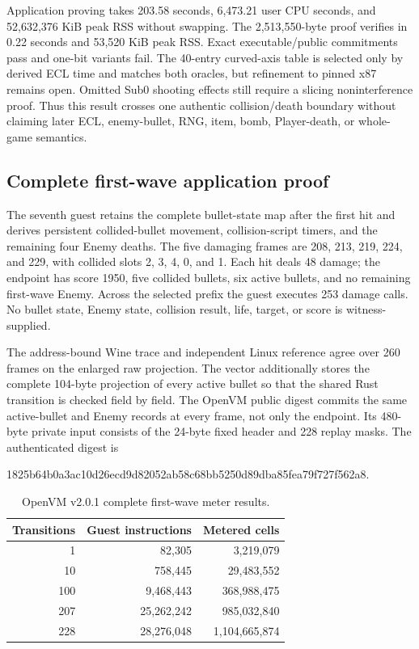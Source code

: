 Application proving takes 203.58 seconds, 6,473.21 user CPU seconds, and
52,632,376 KiB peak RSS without swapping.  The 2,513,550-byte proof verifies in
0.22 seconds and 53,520 KiB peak RSS.  Exact executable/public commitments pass
and one-bit variants fail.  The 40-entry curved-axis table is selected only by
derived ECL time and matches both oracles, but refinement to pinned x87
 remains open.  Omitted Sub0 shooting effects still require a
slicing noninterference proof.  Thus this result crosses one authentic
collision/death boundary without claiming later ECL, enemy-bullet, RNG, item,
bomb, Player-death, or whole-game semantics.

\subsection{Complete first-wave application proof}

The seventh guest retains the complete bullet-state map after the first hit
and derives persistent collided-bullet movement, collision-script timers, and
the remaining four Enemy deaths.  The five damaging frames are 208, 213, 219,
224, and 229, with collided slots 2, 3, 4, 0, and 1.  Each hit deals 48 damage;
the endpoint has score 1950, five collided bullets, six active bullets, and no
remaining first-wave Enemy.  Across the selected prefix the guest executes 253
damage calls.  No bullet state, Enemy state, collision result, life, target, or
score is witness-supplied.

The address-bound Wine trace and independent Linux reference agree over 260
frames on the enlarged raw projection.  The  vector additionally
stores the complete 104-byte projection of every active bullet so that the
shared Rust transition is checked field by field.  The OpenVM public digest
commits the same active-bullet and Enemy records at every frame, not only the
endpoint.  Its 480-byte private  input consists of the 24-byte
fixed header and 228 replay masks.  The authenticated digest is
\begin{center}
\small\ttfamily
1825b64b0a3ac10d26ecd9d82052ab58c68bb5250d89dba85fea79f727f562a8.
\end{center}

\begin{table}[h]
  \centering
  \small
  \begin{tabular}{@{}rrr@{}}
    \toprule
    Transitions & Guest instructions & Metered cells \\
    \midrule
    1   & 82,305     & 3,219,079 \\
    10  & 758,445    & 29,483,552 \\
    100 & 9,468,443  & 368,988,475 \\
    207 & 25,262,242 & 985,032,840 \\
    228 & 28,276,048 & 1,104,665,874 \\
    \bottomrule
  \end{tabular}
  \caption{OpenVM v2.0.1 complete first-wave meter results.}
  \label{tab:openvm-first-wave-meter}
\end{table}

